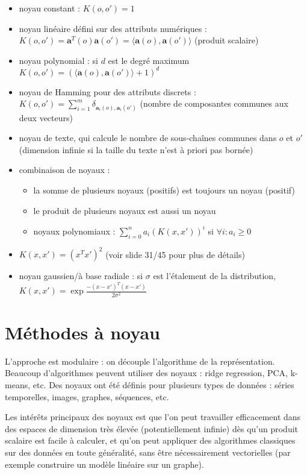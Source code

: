 \begin{itemize}
	\item noyau constant : $K(o, o') = 1$
	\item noyau linéaire défini sur des attributs numériques : $K(o, o') = \mathbf{a}^T(o) \mathbf{a}(o') = \langle \mathbf{a}(o), \mathbf{a}(o')\rangle$ (produit scalaire)
	\item noyau polynomial : si $d$ est le degré maximum $K(o, o') = (\langle \mathbf{a}(o), \mathbf{a}(o') \rangle + 1)^d$
	\item noyau de Hamming pour des attributs discrets : $K(o, o') = \sum_{i = 1}^m \delta_{\mathbf{a}_i(o), \mathbf{a}_i(o')}$ (nombre de composantes communes aux deux vecteurs)
	\item noyau de texte, qui calcule le nombre de sous-chaînes communes dans $o$ et $o'$ (dimension infinie si la taille du texte n'est à priori pas bornée)
	\item combinaison de noyaux :
	
	\begin{itemize}
		\item la somme de plusieurs noyaux (positifs) est toujours un noyau (positif)
		\item le produit de plusieurs noyaux est aussi un noyau
		\item noyaux polynomiaux : $\sum_{i = 0}^n a_i(K(x, x'))^i$ si $\forall i : a_i \geq 0$
	\end{itemize}
	
	\item $K(x, x') = (x^Tx')^2$ (voir slide 31/45 pour plus de détails)
	\item noyau gaussien/à base radiale : si $\sigma$ est l'étalement de la distribution, $K(x, x') = \exp{\frac{-(x - x')^T(x - x')}{2 \sigma^2}}$
\end{itemize}


\section{Méthodes à noyau}


L'approche est modulaire : on découple l'algorithme de la représentation. Beaucoup d'algorithmes peuvent utiliser des noyaux : ridge regression, PCA, k-means, etc. Des noyaux ont été définis pour plusieurs types de données : séries temporelles, images, graphes, séquences, etc.

Les intérêts principaux des noyaux est que l'on peut travailler efficacement dans des espaces de dimension très élevée (potentiellement infinie) dès qu'un produit scalaire est facile à calculer, et qu'on peut appliquer des algorithmes classiques sur des données en toute généralité, sans être nécessairement vectorielles (par exemple construire un modèle linéaire sur un graphe).

